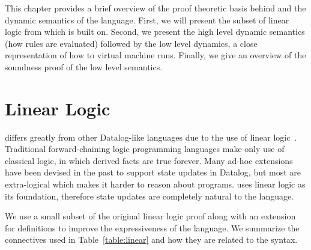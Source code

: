\newcommand{\mz}{\m{match} \;}
\newcommand{\tab}[0]{\;\;\;\;}
\newcommand{\dz}{\m{derive} \;}
\newcommand{\comp}[0]{\m{comp} \;}
\newcommand{\az}{\m{apply} \;}
\newcommand{\doz}{\m{run} \;}
\newcommand{\seqnocut}[3]{#1 ; #2 \Rightarrow #3}
\newcommand{\defeq}{\buildrel\triangle\over =}
\newcommand{\compr}[1]{\m{def} \; #1}

\newcommand{\mo}{\m{match}_1 \;}
\newcommand{\cont}{\m{cont} \;}
\newcommand{\contc}{\m{contc} \;}
\newcommand{\done}{\m{derive}_1 \;}
\newcommand{\doo}{\m{run}_1 \;}
\newcommand{\mc}[0]{\m{match}_c \; }
\newcommand{\dall}[0]{\m{fix} \; }
\newcommand{\strans}[0]{\m{strans} \;}
\newcommand{\dc}{\m{derive}_c \;}
\newcommand{\ao}{\m{apply}_1 \;}

This chapter provides a brief overview of the proof theoretic basis behind \lang and the dynamic semantics
of the language. First, we will present the subset of linear logic from which \lang is built on. Second, we present the high level dynamic semantics (how rules are evaluated) followed by the low level dynamics, a close representation of how to virtual machine runs. Finally, we give an overview of the soundness proof of the low level semantics.

\section{Linear Logic}

\lang differs greatly from other Datalog-like languages due to the use of linear logic~\cite{Girard95logic:its}. Traditional forward-chaining logic programming languages make only use of classical logic, in which derived facts are true forever. Many ad-hoc extensions~\cite{Liu98extendingdatalog,Ludascher95alogical} have been devised in the past to support state updates in Datalog, but most are extra-logical which makes it harder to reason about programs.
\lang uses linear logic as its foundation, therefore state updates are completely natural to the language.

We use a small subset of the original linear logic proof along with an extension for definitions to improve
the expressiveness of the language. We summarize the connectives used in Table~\ref{table:linear}
and how they are related to the \lang syntax.

